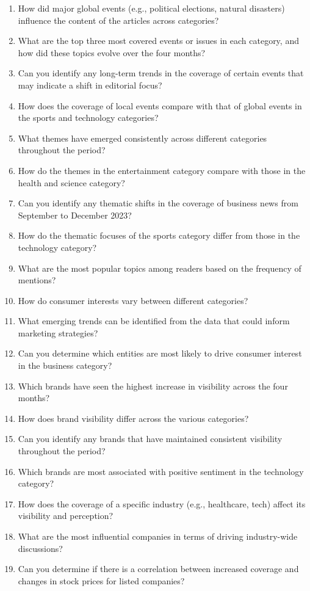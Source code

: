 \begin{footnotesize}
\begin{enumerate}
\item How did major global events (e.g., political elections, natural disasters) influence the content of the articles across categories?
\item What are the top three most covered events or issues in each category, and how did these topics evolve over the four months?
\item Can you identify any long-term trends in the coverage of certain events that may indicate a shift in editorial focus?
\item How does the coverage of local events compare with that of global events in the sports and technology categories?
\item What themes have emerged consistently across different categories throughout the period?
\item How do the themes in the entertainment category compare with those in the health and science category?
\item Can you identify any thematic shifts in the coverage of business news from September to December 2023?
\item How do the thematic focuses of the sports category differ from those in the technology category?
\item What are the most popular topics among readers based on the frequency of mentions?
\item How do consumer interests vary between different categories?
\item What emerging trends can be identified from the data that could inform marketing strategies?
\item Can you determine which entities are most likely to drive consumer interest in the business category?
\item Which brands have seen the highest increase in visibility across the four months?
\item How does brand visibility differ across the various categories?
\item Can you identify any brands that have maintained consistent visibility throughout the period?
\item Which brands are most associated with positive sentiment in the technology category?
\item How does the coverage of a specific industry (e.g., healthcare, tech) affect its visibility and perception?
\item What are the most influential companies in terms of driving industry-wide discussions?
\item Can you determine if there is a correlation between increased coverage and changes in stock prices for listed companies?

\end{enumerate}
\end{footnotesize}
